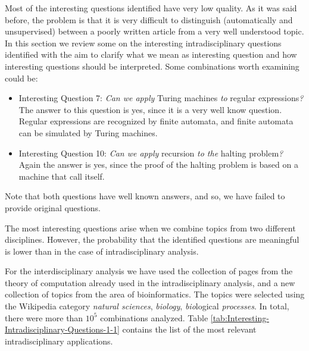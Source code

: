 Most of the interesting questions identified have very low quality.
As it was said before, the problem is that it is very difficult to
distinguish (automatically and unsupervised) between a poorly written
article from a very well understood topic. In this section we review
some on the interesting intradisciplinary questions identified with
the aim to clarify what we mean as interesting question and how interesting
questions should be interpreted. Some combinations worth examining
could be:
\begin{itemize}
\item Interesting Question 7: \emph{Can we apply }Turing machines\emph{
to }regular expressions\emph{?} The answer to this question is yes,
since it is a very well know question. Regular expressions are recognized
by finite automata, and finite automata can be simulated by Turing
machines.
\item Interesting Question 10: \emph{Can we apply }recursion\emph{ to the
}halting problem\emph{?} Again the answer is yes, since the proof
of the halting problem is based on a machine that call itself.
\end{itemize}
Note that both questions have well known answers, and so, we have
failed to provide original questions.

The most interesting questions arise when we combine topics from two
different disciplines. However, the probability that the identified
questions are meaningful is lower than in the case of intradisciplinary
analysis.

For the interdisciplinary analysis we have used the collection of
pages from the theory of computation already used in the intradisciplinary
analysis, and a new collection of topics from the area of\emph{ }bioinformatics.
The topics were selected using the Wikipedia category \emph{natural
sciences}, \emph{biology}, \emph{bio}logical\emph{ processes}. In
total, there were more than $10^{5}$ combinations analyzed. Table
\ref{tab:Interesting-Intradisciplinary-Questions-1-1} contains the
list of the most relevant intradisciplinary applications.

